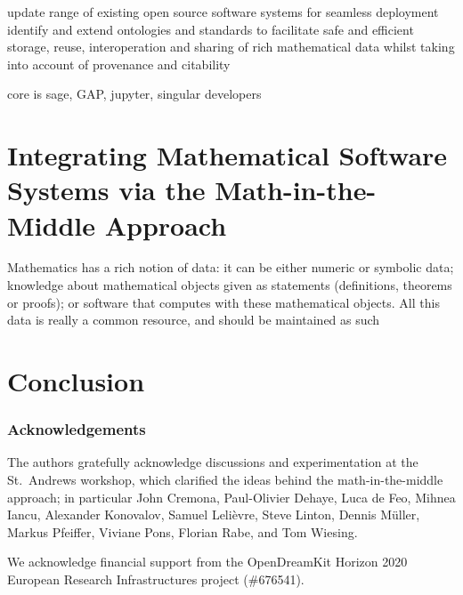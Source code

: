 \documentclass{llncs}
\begin{document}
update range of existing open source software systems for seamless deployment 
identify and extend ontologies and standards to facilitate safe and efficient storage, reuse, interoperation and sharing of rich mathematical data whilst taking into account of provenance and citability

core is sage, GAP, jupyter, singular developers




\section{Integrating Mathematical Software Systems via the Math-in-the-Middle Approach}
Mathematics has a rich notion of data: it can be either numeric or symbolic data; knowledge about mathematical objects
given as statements (definitions, theorems or proofs); or software that computes with these mathematical objects. All this data
is really a common resource, and should be maintained as such

\section{Conclusion}
\subsubsection*{Acknowledgements}
The authors gratefully acknowledge discussions and experimentation at the St.\ Andrews
workshop, which clarified the ideas behind the math-in-the-middle approach;
in particular John Cremona, Paul-Olivier Dehaye, Luca de Feo, Mihnea Iancu, Alexander
Konovalov, Samuel Leli\`evre, Steve Linton, Dennis M\"uller, Markus Pfeiffer, Viviane Pons,
Florian Rabe, and Tom Wiesing.

We acknowledge financial support from the OpenDreamKit Horizon 2020 European Research
Infrastructures project (\#676541).

\printbibliography
\end{document}

